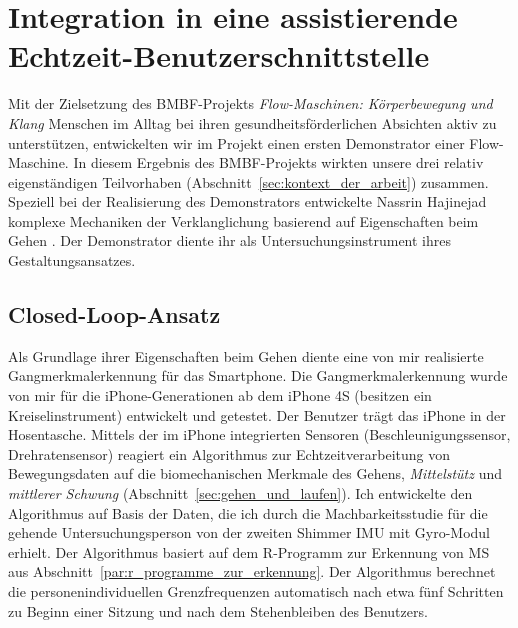 

\chapter{Integration in eine assistierende Echtzeit-Benutzerschnittstelle} \label{cha:integration_in_eine_assistierende_echtzeit_benutzerschnittstelle}

Mit der Zielsetzung des \acs{BMBF}-Projekts \emph{Flow-Maschinen: Körperbewegung und Klang} Menschen im Alltag bei ihren gesundheitsförderlichen Absichten aktiv zu unterstützen, entwickelten wir im Projekt einen ersten Demonstrator einer Flow-Maschine. In diesem Ergebnis des \acs{BMBF}-Projekts wirkten unsere drei relativ eigenständigen Teilvorhaben (Abschnitt~\ref{sec:kontext_der_arbeit}) zusammen. Speziell bei der Realisierung des Demonstrators entwickelte Nassrin Hajinejad komplexe Mechaniken der Verklanglichung basierend auf Eigenschaften beim Gehen \citep{Hajinejad2013, Hajinejad2015}. Der Demonstrator diente ihr als Untersuchungsinstrument ihres Gestaltungsansatzes.

\section{Closed-Loop-Ansatz} 

\label{sec:closed_loop_ansatz}

Als Grundlage ihrer Eigenschaften beim Gehen diente eine von mir realisierte Gangmerkmalerkennung für das Smartphone. Die Gangmerkmalerkennung wurde von mir für die iPhone-Generationen ab dem iPhone 4S (besitzen ein Kreiselinstrument) entwickelt und getestet. Der Benutzer trägt das iPhone in der Hosentasche. Mittels der im iPhone integrierten Sensoren (Beschleunigungssensor, Drehratensensor) reagiert ein Algorithmus zur Echtzeitverarbeitung von Bewegungsdaten auf die biomechanischen Merkmale des Gehens, \emph{Mittelstütz} und \emph{mittlerer Schwung} (Abschnitt~\ref{sec:gehen_und_laufen}). Ich entwickelte den Algorithmus auf Basis der Daten, die ich durch die Machbarkeitsstudie für die gehende Untersuchungsperson von der zweiten Shimmer \ac{IMU} mit Gyro-Modul erhielt. Der Algorithmus basiert auf dem R-Programm zur Erkennung von \ac{MS} aus Abschnitt~\ref{par:r_programme_zur_erkennung}. Der Algorithmus berechnet die personenindividuellen Grenzfrequenzen automatisch nach etwa fünf Schritten zu Beginn einer Sitzung und nach dem Stehenbleiben des Benutzers.

